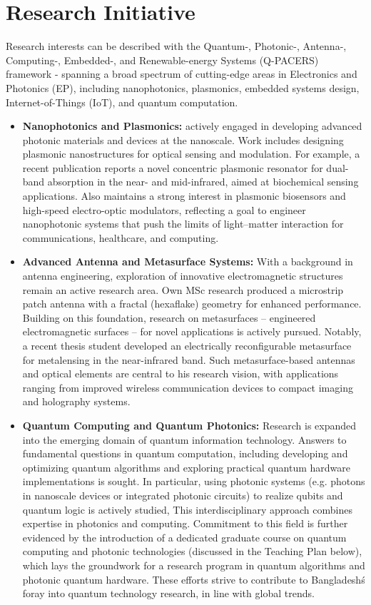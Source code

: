 \documentclass[cvauthor={Dr. Sajid Muhaimin Choudhury}]{buetcv}
\begin{document}
\section{Research Initiative}
Research interests can be described with the Quantum-, Photonic-, Antenna-, Computing-, Embedded-, and Renewable-energy Systems (Q-PACERS) framework - spanning a broad spectrum of cutting-edge areas in Electronics and Photonics (EP), including nanophotonics, plasmonics, embedded systems design, Internet-of-Things (IoT), and quantum computation. 
\begin{itemize}
    \item \textbf{Nanophotonics and Plasmonics:} actively engaged in developing advanced photonic materials and devices at the nanoscale. Work includes designing plasmonic nanostructures for optical sensing and modulation. For example, a recent publication reports a novel concentric plasmonic resonator for dual-band absorption in the near- and mid-infrared, aimed at biochemical sensing applications. Also maintains a strong interest in plasmonic biosensors and high-speed electro-optic modulators, reflecting a goal to engineer nanophotonic systems that push the limits of light–matter interaction for communications, healthcare, and computing.
    \item \textbf{Advanced Antenna and Metasurface Systems:} With a background in antenna engineering, exploration of innovative electromagnetic structures remain an active research area. Own MSc research produced a microstrip patch antenna with a fractal (hexaflake) geometry for enhanced performance. Building on this foundation, research on metasurfaces – engineered electromagnetic surfaces – for novel applications is actively pursued. Notably, a recent thesis student developed an electrically reconfigurable metasurface for metalensing in the near-infrared band. Such metasurface-based antennas and optical elements are central to his research vision, with applications ranging from improved wireless communication devices to compact imaging and holography systems.
    \item \textbf{Quantum Computing and Quantum Photonics:} Research is expanded into the emerging domain of quantum information technology. Answers to fundamental questions in quantum computation, including developing and optimizing quantum algorithms and exploring practical quantum hardware implementations is sought. In particular, using photonic systems (e.g. photons in nanoscale devices or integrated photonic circuits) to realize qubits and quantum logic is actively studied, This interdisciplinary approach combines expertise in photonics and computing. Commitment to this field is further evidenced by the introduction of a dedicated graduate course on quantum computing and photonic technologies (discussed in the Teaching Plan below), which lays the groundwork for a research program in quantum algorithms and photonic quantum hardware. These efforts strive to contribute to Bangladesh\'s foray into quantum technology research, in line with global trends.

\end{itemize}
\end{document}
